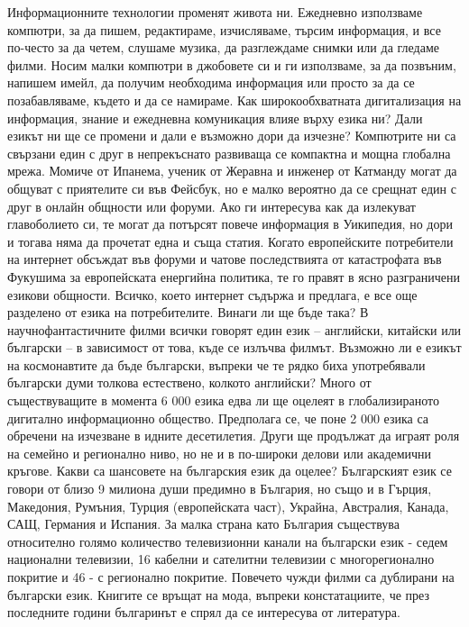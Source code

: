   \begin{multicols}{2}
  Информационните технологии променят живота ни. Ежедневно използваме компютри, за да пишем, редактираме, изчисляваме, търсим информация, и все по-често за да четем, слушаме музика, да разглеждаме снимки или да гледаме филми. Носим малки компютри в джобовете си и ги използваме, за да позвъним, напишем имейл, да получим необходима информация или просто за да се позабавляваме, където и да се намираме. Как широкообхватната дигитализация на информация, знание и ежедневна комуникация влияе върху езика ни? Дали езикът ни ще се промени и дали е възможно дори да изчезне?
Компютрите ни са свързани един с друг в непрекъснато развиваща се компактна и мощна глобална мрежа. Момиче от Ипанема, ученик от Жеравна и инженер от Катманду могат да общуват с приятелите си във Фейсбук, но е малко вероятно да се срещнат един с друг в онлайн общности или форуми. Ако ги интересува как да излекуват главоболието си, те могат да потърсят повече информация в Уикипедия, но дори и тогава няма да прочетат една и съща статия. Когато европейските потребители на интернет обсъждат във форуми и чатове последствията от катастрофата във Фукушима за европейската енергийна политика, те го правят в ясно разграничени езикови общности. Всичко, което интернет съдържа и предлага, е все още разделено от езика на потребителите. Винаги ли ще бъде така?
В научнофантастичните филми всички говорят един език – английски, китайски или български – в зависимост от това, къде се излъчва филмът. Възможно ли е езикът на космонавтите да бъде български, въпреки че те рядко биха употребявали български думи толкова естествено, колкото английски? Много от съществуващите в момента 6 000 езика едва ли ще оцелеят в глобализираното дигитално информационно общество. Предполага се, че поне 2 000 езика са обречени на изчезване в идните десетилетия. Други ще продължат да играят роля на семейно и регионално ниво, но не и в по-широки делови или академични кръгове. Какви са шансовете на българския език да оцелее?
Българският език се говори от близо 9 милиона души предимно в България, но също 
и в Гърция, Македония, Румъния, Турция (европейската част), Украйна, Австралия, Канада, САЩ, Германия и Испания. За малка страна като България съществува относително голямо количество телевизионни канали на български език - седем национални телевизии, 16 кабелни и сателитни телевизии с многорегионално покритие и 46 - с регионално покритие.  Повечето чужди филми са дублирани на български език. Книгите се връщат на мода, въпреки констатациите, че през последните години българинът е спрял да се интересува от литература.

\end{multicols}
